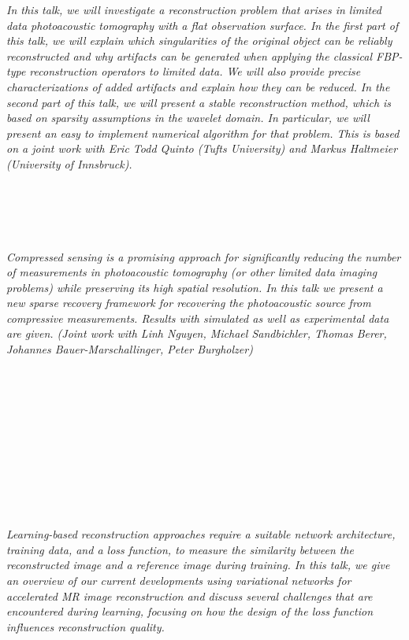   \begin{multicols}{2}
      \textit{In this talk, we will investigate a reconstruction problem that arises in limited data photoacoustic tomography with a flat observation surface. In the first part of this talk, we will explain which singularities of the original object can be reliably reconstructed and why artifacts can be generated when applying the classical FBP-type reconstruction operators to limited data. We will also provide precise characterizations of added artifacts and explain how they can be reduced. In the second part of this talk, we will present a stable reconstruction method, which is based on sparsity assumptions in the wavelet  domain. In particular, we will present an easy to implement numerical algorithm for that problem.
This is based on a joint work with Eric Todd Quinto (Tufts University) and Markus Haltmeier (University of Innsbruck).}\\
\\ 
        \\
        \\\\
\\
      \textit{Compressed sensing is a promising approach for significantly reducing the number of measurements in photoacoustic tomography (or other limited data imaging problems) while preserving its high spatial resolution. In this talk we present a new sparse recovery framework for recovering the photoacoustic source from compressive measurements.  Results with simulated as well as experimental data are given. (Joint work with Linh Nguyen, Michael Sandbichler, Thomas Berer, Johannes Bauer-Marschallinger, Peter Burgholzer)}\\
\\ 
        \\
        \\\\
        \\
        \\\\
        \\
        \\\\
\\
      \textit{Learning-based reconstruction approaches require a suitable network architecture, training data, and a loss function, to measure the similarity between the reconstructed image and a reference image during training. In this talk, we give an overview of our current developments using variational networks for accelerated MR image reconstruction and discuss several challenges that are encountered during learning, focusing on how the design of the loss function influences reconstruction quality.}\\

\end{multicols}
